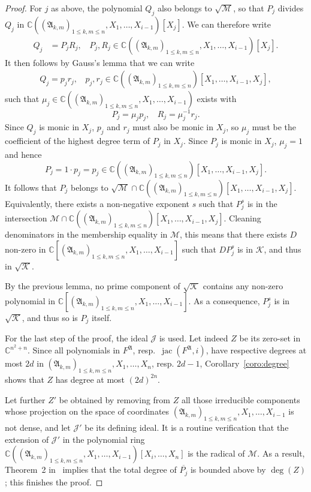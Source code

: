 \documentclass[12pt]{article}
\def\A{\mathfrak{A}}
\DeclareMathOperator{\jac}{jac}
\def\C{\mathbb{C}}
\begin{document}
\begin{proof}
  \smallskip{}  For $j$ as above, the polynomial $Q_j$
  also belongs to $\sqrt{\mathscr{M}}$, so that $P_j$ divides $Q_j$ in
  $\C((\A_{k,m})_{1 \le k,m \le n},X_1,\dots,X_{i-1})[X_j].$ We can
  therefore write
  \begin{align*}
    Q_j &= P_jR_j,~~~~ P_j,R_j \in \C((\A_{k,m})_{1 \le k,m \le n},X_1,\dots,X_{i-1})[X_j].
  \end{align*}
  It then follows by Gauss's lemma that we can write
  \begin{align*}
    Q_j = p_jr_j, ~~~~p_j,r_j \in \C((\A_{k,m})_{1 \le k,m \le n})[X_1,\dots,X_{i-1},X_j],
  \end{align*}
  such that $\mu_j \in \C((\A_{k,m})_{1 \le k,m \le n},X_1,\dots,X_{i-1})$ exists with 
  \[
  P_j = \mu_j p_j,~~~~ R_j = \mu_j^{-1}r_j.
  \]
  Since $Q_j$ is monic in $X_j$, $p_j$ and $r_j$ must also be monic in
  $X_j$, so $\mu_j$ must be the coefficient of the highest degree term
  of $P_j$ in $X_j.$ Since $P_j$ is monic in $X_j$, $\mu_j =1$ and
  hence \[P_j=1\cdot p_j=p_j \in \C((\A_{k,m})_{1 \le k,m \le
    n})[X_1,\dots,X_{i-1},X_j].\] 
  It follows that $P_j$ belongs to $\sqrt{\mathscr{M}} \cap
  \C((\A_{k,m})_{1 \le k,m \le n})[X_1,\dots,X_{i-1},X_j]$.
  Equivalently, there exists a non-negative exponent $s$ such that
  $P_j^s$ is in the intersection $\mathscr{M} \cap \C((\A_{k,m})_{1 \le k,m \le
    n})[X_1,\dots,X_{i-1},X_j]$.  Cleaning denominators in the
  membership equality in $\mathscr{M}$, this means that there exists
  $D$ non-zero in $ \C[(\A_{k,m})_{1 \le k,m \le
      n},X_1,\dots,X_{i-1}]$ such that $D P_j^s$ is in $\mathscr{K}$,
  and thus in $\sqrt{\mathscr{K}}$.

  By the previous lemma, no prime component of $\sqrt{\mathscr{K}}$
  contains any non-zero polynomial in $ \C[(\A_{k,m})_{1 \le k,m \le
      n},X_1,\dots,X_{i-1}]$. As a consequence, $P_j^s$ is in
  $\sqrt{\mathscr{K}}$, and thus so is $P_j$ itself.
  
  \smallskip{}  For
  the last step of the proof, the ideal $\mathscr{J}$ is used.  Let
  indeed $Z$ be its zero-set in $\C^{n^2 + n}$. Since all polynomials in
  $F^\A$, resp.\ $\jac(F^\A, i)$, have respective degrees at most $2d$
  in $(\A_{k,m})_{1 \le k,m \le n},X_1,\dots,X_n$, resp. $2d-1$,
  Corollary~\ref{coro:degree} shows that $Z$ has degree at most
  $(2d)^{2n}$.

  Let further $Z'$ be obtained by removing from $Z$ all those
  irreducible components whose projection on the space of coordinates
  $(\A_{k,m})_{1 \le k,m \le n},X_1,\dots,X_{i-1}$ is not dense, and
  let $\mathscr{J}'$ be its defining ideal. It is a routine
  verification that the extension of $\mathscr{J}'$ in the polynomial
  ring $\C((\A_{k,m})_{1 \le k,m \le
    n},X_1,\dots,X_{i-1})[X_{i},\dots,X_n]$ is the radical of
  $\mathscr{M}$. As a result, Theorem~2 in~\cite{DaSc04} implies 
  that the total degree of $\overline{P_j}$ is bounded above by $\deg(Z)$;
  this finishes the proof.
\end{proof}
\end{document}
